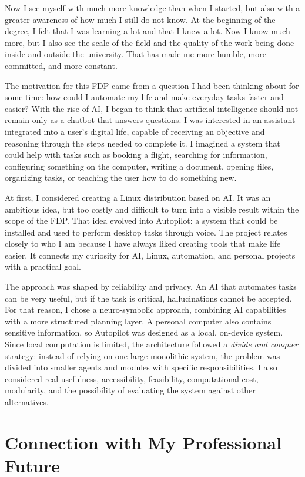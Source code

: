 Now I see myself with much more knowledge than when I started, but also with a greater awareness of how much I still do not know. At the beginning of the degree, I felt that I was learning a lot and that I knew a lot. Now I know much more, but I also see the scale of the field and the quality of the work being done inside and outside the university. That has made me more humble, more committed, and more constant.

The motivation for this FDP came from a question I had been thinking about for some time: how could I automate my life and make everyday tasks faster and easier? With the rise of AI, I began to think that artificial intelligence should not remain only as a chatbot that answers questions. I was interested in an assistant integrated into a user's digital life, capable of receiving an objective and reasoning through the steps needed to complete it. I imagined a system that could help with tasks such as booking a flight, searching for information, configuring something on the computer, writing a document, opening files, organizing tasks, or teaching the user how to do something new.

At first, I considered creating a Linux distribution based on AI. It was an ambitious idea, but too costly and difficult to turn into a visible result within the scope of the FDP. That idea evolved into Autopilot: a system that could be installed and used to perform desktop tasks through voice. The project relates closely to who I am because I have always liked creating tools that make life easier. It connects my curiosity for AI, Linux, automation, and personal projects with a practical goal.

The approach was shaped by reliability and privacy. An AI that automates tasks can be very useful, but if the task is critical, hallucinations cannot be accepted. For that reason, I chose a neuro-symbolic approach, combining AI capabilities with a more structured planning layer. A personal computer also contains sensitive information, so Autopilot was designed as a local, on-device system. Since local computation is limited, the architecture followed a \textit{divide and conquer} strategy: instead of relying on one large monolithic system, the problem was divided into smaller agents and modules with specific responsibilities. I also considered real usefulness, accessibility, feasibility, computational cost, modularity, and the possibility of evaluating the system against other alternatives.

\section{Connection with My Professional Future}

